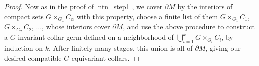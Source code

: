 \documentclass[11pt]{amsart}
\theoremstyle{definition}
\numberwithin{equation}{section}
\numberwithin{figure}{section}
\newcommand{\R}{\mathbb R}
\begin{document}
\begin{proof}
	Now as in the proof of \autoref{ntn_step1}, we cover $\partial M$ by the interiors of compact sets $G \times_{G_x} C_\alpha$ with this property, choose a finite list of them $G \times_{G_1} C_1$, $G \times_{G_2} C_2$, $\ldots$, whose interiors cover $\partial M$, and use the above procedure to construct a $G$-invariant collar germ defined on a neighborhood of $\bigcup_{i=1}^k G \times_{G_i} C_i$, by induction on $k$. After finitely many stages, this union is all of $\partial M$, giving our desired compatible $G$-equivariant collars.

\end{proof}
\end{document}
